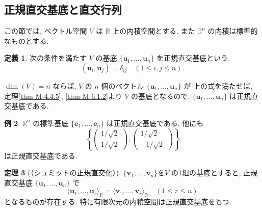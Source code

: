 \documentclass[dvipdfmx,a4paper,11pt]{article} %
\theoremstyle{definition}
\newtheorem{thm}{定理}[section]
\newtheorem{defn}[thm]{定義}
\newtheorem{ex}[thm]{例}
\begin{document}
\subsection{正規直交基底と直交行列 \cite[6.2節]{M}}

この節では, ベクトル空間 $V$ は $\mathbb{R}$ 上の内積空間とする. また $\mathbb{R}^n$ の内積は標準的なものとする.
\begin{defn}
次の条件を満たす $V$ の基底 $\{\bm{u}_1,\ldots,\bm{u}_n\}$ を正規直交基底という.
\[
(\bm{u}_i,\bm{u}_j)=\delta_{ij}
\quad(1\leq i,j\leq n).
\]
\end{defn}
$\dim(V)=n$ ならば, $V$ の $n$ 個のベクトル $\{\bm{u}_1,\ldots,\bm{u}_n\}$ が 上の式を満たせば,
定理\ref{thm-M-4.4.5}, \ref{thm-M-6.1.2}より $V$ の基底となるので, $\{\bm{u}_1,\ldots,\bm{u}_n\}$ は正規直交基底である.

\begin{ex}
$\mathbb{R}^n$ の標準基底 $\{\bm{e}_1,\ldots,\bm{e}_n\}$ は正規直交基底である.
他にも
\[
\left\{
\begin{pmatrix}
1/\sqrt{2}\\
1/\sqrt{2}
\end{pmatrix},
\begin{pmatrix}
1/\sqrt{2}\\
-1/\sqrt{2}
\end{pmatrix}
\right\}
\]
は正規直交基底である.
\end{ex}

\begin{thm}
[（シュミットの正規直交化）{\cite[定理 6.2.1]{M}}]
\label{thm-M-6.2.1}
$\{\bm{v}_1,\ldots,\bm{v}_n\}$を$V$ の1組の基底とすると, 正規直交基底 $\{\bm{u}_1,\ldots,\bm{u}_n\}$ で
\[
\langle \bm{u}_1,\ldots,\bm{u}_r\rangle_{\mathbb{R}}
=
\langle \bm{v}_1,\ldots,\bm{v}_r\rangle_{\mathbb{R}}
\quad(1\leq r\leq n)
\]
となるものが存在する. 特に有限次元の内積空間は正規直交基底をもつ.
\end{thm}
\end{document}
